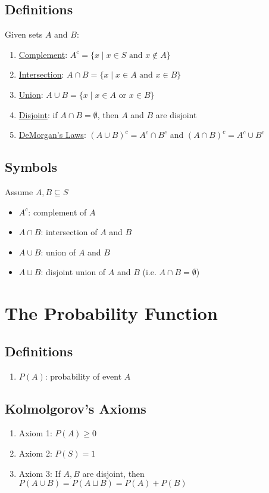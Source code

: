 \documentclass[12pt]{article}
\begin{document}
        \subsection{Definitions}
            Given sets $A$ and $B$:
            \begin{enumerate}
                \item \underline{Complement}: $A^c = \{x \mid x \in S \text{ and } x \notin A\}$
                \item \underline{Intersection}: $A \cap B = \{x \mid x \in A \text{ and } x \in B\}$
                \item \underline{Union}: $A \cup B = \{x \mid x \in A \text{ or } x \in B\}$
                \item \underline{Disjoint}: if $A \cap B = \emptyset$, then $A$ and $B$ are disjoint
                \item \underline{DeMorgan's Laws}: $(A \cup B)^c = A^c \cap B^c$ and $(A \cap B)^c = A^c \cup B^c$
            \end{enumerate}
        \subsection{Symbols}
            Assume $A, B \subseteq S$
            \begin{itemize}
                \item $A^c$: complement of $A$
                \item $A \cap B$: intersection of $A$ and $B$
                \item $A \cup B$: union of $A$ and $B$
                \item $A \sqcup B$: disjoint union of $A$ and $B$ (i.e. $A \cap B = \emptyset$)
            \end{itemize}
    \section{The Probability Function}
        \subsection{Definitions}
            \begin{enumerate}
                \item \underline{$P(A)$}: probability of event $A$
            \end{enumerate}
        \subsection{Kolmolgorov's Axioms}
            \begin{enumerate}
                \item Axiom 1: $P(A) \geq 0$
                \item Axiom 2: $P(S) = 1$
                \item Axiom 3: If $A, B$ are disjoint, then $P(A \cup B) = P(A \sqcup B) = P(A) + P(B)$
            \end{enumerate}
\end{document}
